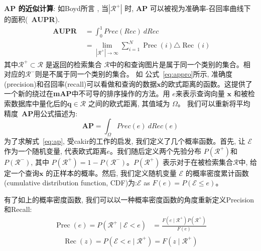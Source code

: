 \textbf{AP 的近似计算}: 如Boyd所言 \cite{boyd2013area}, 当$|\mathcal{R}^{+}|$ 时, \textbf{AP} 可以被视为准确率-召回率曲线下的面积(~\textbf{AUPR}).
\begin{equation}
    \label{eq:appro}
    \begin{aligned}
    \textbf { AUPR } &=\int_{0}^{1} Prec(Rec) \ d Rec \\
    &=\lim _{\left|\mathcal{R}^{+}\right| \rightarrow \infty} \sum_{i=1}^{N} \operatorname{Prec}(i) \triangle \operatorname{Rec}(i)
    \end{aligned}
\end{equation}
其中$\mathcal{R}^{+} \subset \mathcal{R}$ 是返回的检索集合 $\mathcal{R}$中的和查询图片是属于同一个类别的集合。相对应的$\mathcal{R}^{-}$则是不属于同一个类别的集合。 如 公式~\ref{eq:appro}所示, 准确度(precision)和召回率(recall)可以看做和查询的数据$\mathbf{x}$的欧式距离的函数。这提供了一个新的绕过在\textbf{mAP}中不可导的排序操作的方法。用 $e$来表示查询向量 $\mathbf{x}$ 和被检索数据库中量化后的$\mathbf{q} \in {\mathcal{R}}$ 之间的欧式距离, 其值域为 $\Omega$。 我们可以重新将平均精度~\textbf{AP}用公式描述为:
\begin{equation}
    \label{eq:ap}
     \textbf{AP} = \int_{\Omega}Prec(e) \ dRec(e)
\end{equation}
为了求解式~\ref{eq:ap}, 受cakir的工作\cite{cakir2019deep}的启发, 我们定义了几个概率函数。首先, 让 $\mathcal{E}$ 作为一个随机变量, 代表欧式距离$e$。我们随后定义两个先验分布 $P(\mathcal{R}^{+})$和$P(\mathcal{R}^{-})$, 其中 $P(\mathcal{R}^{+}) = 1 - P(\mathcal{R}^{-})$。$P(\mathcal{R}^{+})$ 表示对于在被检索集合$\mathcal{R}$中, 给定一个查询$\mathbf{x}$ 的正样本的概率。然后, 我们定义随机变量 $\mathcal{E}$ 的概率密度累计函数(cumulative distribution function, CDF)为:$\mathcal{E}$ as $F(e) = P(\mathcal{E} \le e)$。 \par
有了如上的概率密度函数, 我们可以以一种概率密度函数的角度重新定义Precision 和Recall:
\begin{equation}
    \label{eq:bayesian}
    \begin{aligned}
    \operatorname{Prec}(e)=P\left(\mathcal{R}^{+} \mid \mathcal{E}<e\right) 
    &=\frac{F\left(e \mid \mathcal{R}^{+}\right) P\left(\mathcal{R}^{+}\right)}{F(e)} \\
    \end{aligned}
    \end{equation}
\begin{equation}
\operatorname{Rec}(z)=P\left(\mathcal{E}<e \mid \mathcal{R}^{+}\right)=F\left(z \mid \mathcal{R}^{+}\right)
\end{equation}
